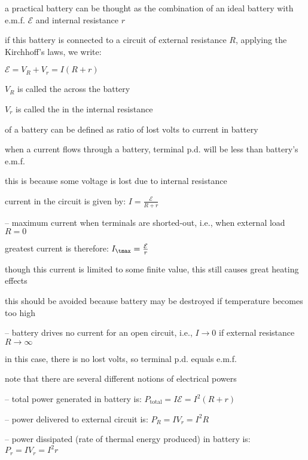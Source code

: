 a practical battery can be thought as the combination of an ideal battery with e.m.f. $\mathcal{E}$ and internal resistance $r$

if this battery is connected to a circuit of external resistance $R$, applying the Kirchhoff's laws, we write:

{
	\centering
	
	$\boxed{\mathcal{E} = V_R + V_r = I(R+r)}$
	
}

$V_R$ is called the  across the battery

$V_r$ is called the  in the internal resistance

\cmt {} of a battery can be defined as ratio of lost volts to current in battery

\cmt when a current flows through a battery, terminal p.d. will be less than battery's e.m.f.

this is because some voltage is lost due to internal resistance


\cmt current in the circuit is given by: $I = \frac{\mathcal{E}}{R+r}$

\begin{compactitem}
	\item[--] maximum current when terminals are shorted-out, i.e., when external load $R=0$
	
	greatest current is therefore: $I_\tmax = \frac{\mathcal{E}}{r}$
	
	though this current is limited to some finite value, this still causes great heating effects
	
	this should be avoided because battery may be destroyed if temperature becomes too high
	
	\item[--] battery drives no current for an open circuit, i.e., $I \to 0$ if external resistance $R \to \infty$
	
	in this case, there is no lost volts, so terminal p.d. equals e.m.f.
\end{compactitem}

\cmt note that there are several different notions of electrical powers

\begin{compactitem}
	\item[--] total power generated in battery is: $P_\text{total} = I\mathcal{E} = I^2 (R+r)$

	\item[--] power delivered to external circuit is: $P_R = I V_r = I^2 R$

	\item[--] power dissipated (rate of thermal energy produced) in battery is: $P_r = I V_r = I^2 r$
\end{compactitem}

